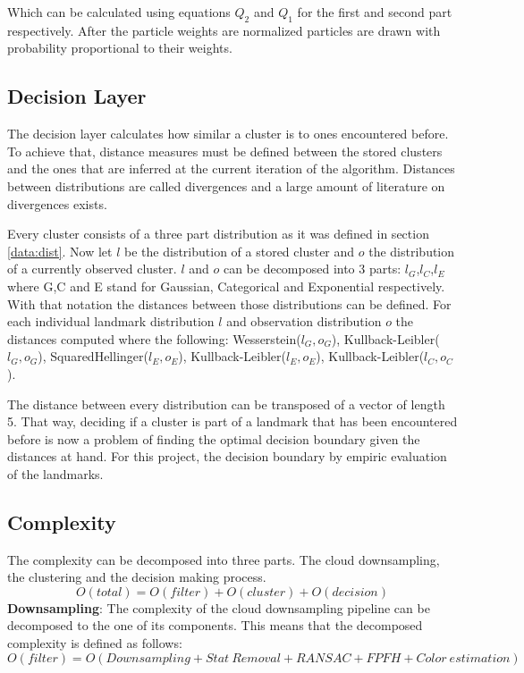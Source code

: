 \documentclass[]{article}
\begin{document}
    Which can be calculated using equations $Q_2$ and $Q_1$ for the first and second part respectively. After the particle weights are normalized particles are drawn with probability proportional to their weights.

    \subsection{Decision Layer}

    The decision layer calculates how similar a cluster is to ones encountered before. To achieve that, distance measures must be defined between the stored clusters and the ones that are inferred at the current iteration of the algorithm. Distances between distributions are called divergences and a large amount of literature on divergences exists.

    Every cluster consists of a three part distribution as it was defined in section \ref{data:dist}. Now let $l$ be the distribution of a stored cluster and $o$ the distribution of a currently observed cluster. $l$ and $o$ can be decomposed into 3 parts: $l_G$,$l_C$,$l_E$ where G,C and E stand for Gaussian, Categorical and Exponential respectively. With that notation the distances between those distributions can be defined. For each individual landmark distribution $l$ and observation distribution $o$ the distances computed where the following: Wesserstein($l_G,o_G$), Kullback-Leibler($l_G,o_G$), SquaredHellinger($l_E,o_E$), Kullback-Leibler($l_E,o_E$), Kullback-Leibler($l_C,o_C$).

    The distance between every distribution can be transposed of a vector of length 5. That way, deciding if a cluster is part of a landmark that has been encountered before is now a problem of finding the optimal decision boundary given the distances at hand. For this project, the decision boundary by empiric evaluation of the landmarks.



    \subsection{Complexity}

    The complexity can be decomposed into three parts. The cloud downsampling, the clustering and the decision making process.
    $$
    O(total) = O(filter) + O(cluster) + O(decision)
    $$
    \textbf{Downsampling}: The complexity of the cloud downsampling pipeline can be decomposed to the one of its components. This means that the decomposed complexity is defined as follows:
    $$O(filter) = O(Downsampling + Stat\ Removal + RANSAC+ FPFH + Color\ estimation) $$
\end{document}
